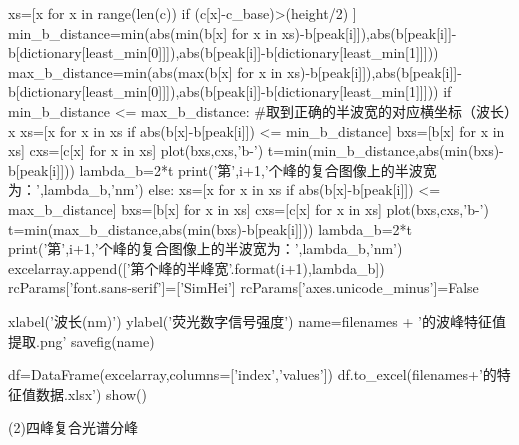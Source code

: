 \documentclass{article}
\numberwithin{equation}{subsection}
\begin{document}
\begin{python}
        xs=[x for x in range(len(c)) if (c[x]-c_base)>(height/2) ]
        min_b_distance=min(abs(min(b[x] for x in xs)-b[peak[i]]),abs(b[peak[i]]-b[dictionary[least_min[0]]]),abs(b[peak[i]]-b[dictionary[least_min[1]]]))
        max_b_distance=min(abs(max(b[x] for x in xs)-b[peak[i]]),abs(b[peak[i]]-b[dictionary[least_min[0]]]),abs(b[peak[i]]-b[dictionary[least_min[1]]]))   
        if min_b_distance <= max_b_distance:                #取到正确的半波宽的对应横坐标（波长）x
            xs=[x for x in xs if abs(b[x]-b[peak[i]]) <= min_b_distance]
            bxs=[b[x] for x in xs]
            cxs=[c[x] for x in xs]
            plot(bxs,cxs,'b-')
            t=min(min_b_distance,abs(min(bxs)-b[peak[i]]))
            lambda_b=2*t
            print('第',i+1,'个峰的复合图像上的半波宽为：',lambda_b,'nm')
        else:
            xs=[x for x in xs if abs(b[x]-b[peak[i]]) <= max_b_distance]
            bxs=[b[x] for x in xs]
            cxs=[c[x] for x in xs]
            plot(bxs,cxs,'b-')
            t=min(max_b_distance,abs(min(bxs)-b[peak[i]]))
            lambda_b=2*t
            print('第',i+1,'个峰的复合图像上的半波宽为：',lambda_b,'nm')
        excelarray.append(['第{}个峰的半峰宽'.format(i+1),lambda_b])
    rcParams['font.sans-serif']=['SimHei']
    rcParams['axes.unicode_minus']=False

    xlabel('波长(nm)')
    ylabel('荧光数字信号强度')
    name=filenames + '的波峰特征值提取.png'
    savefig(name)

    df=DataFrame(excelarray,columns=['index','values'])
    df.to_excel(filenames+'的特征值数据.xlsx')
    show()    
\end{python}
(2)四峰复合光谱分峰
\end{document}
